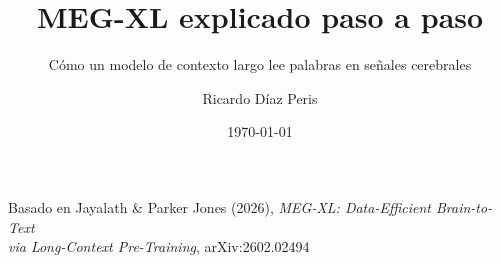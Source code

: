 \documentclass[aspectratio=169,10pt]{beamer}
\title[MEG-XL]{MEG-XL explicado paso a paso}
\subtitle{Cómo un modelo de contexto largo lee palabras en señales cerebrales}
\author{Ricardo Díaz Peris}
\institute{Dpto.\ de Sistemas Informáticos y Computación · UPV}
\date{\today}
\begin{document}
{
\begin{frame}[plain]
  \vspace{6mm}
  \begin{center}
    {\Large\bfseries\color{white}\inserttitle\par}
    \vspace{3mm}
    {\normalsize\color{white}\insertsubtitle\par}
    \vspace{10mm}
    {\normalsize\color{white}\insertauthor\par}
    \vspace{1.5mm}
    {\small\color{white}\insertinstitute\par}
    \vspace{10mm}
    {\footnotesize\color{white!80}Basado en Jayalath \& Parker Jones (2026), \emph{MEG-XL: Data-Efficient Brain-to-Text\\ via Long-Context Pre-Training}, arXiv:2602.02494\par}
  \end{center}
\end{frame}
}
\end{document}
